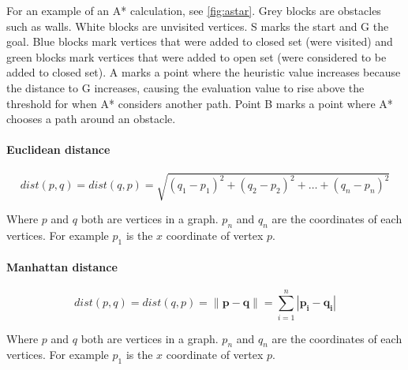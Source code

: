   For an example of an A* calculation, see \cref{fig:astar}. 
  Grey blocks are obstacles such as walls. White blocks are unvisited vertices. S marks the start and G the goal. Blue blocks mark vertices that were added to closed set (were visited) and green blocks mark vertices that were added to open set (were considered to be added to closed set). A marks a point where the heuristic value increases because the distance to G increases, causing the evaluation value to rise above the threshold for when A* considers another path. Point B marks a point where A* chooses a path around an obstacle.

  \paragraph{Euclidean distance}\cite{wiki_euclidean}

  \[
    dist(p, q) = dist(q, p) = \sqrt{(q_{1} - p_{1})^2 + (q_{2} - p_{2})^2 + \dots + (q_{n} - p_{n})^2}
  \]

  Where $p$ and $q$ both are vertices in a graph. $p_{n}$ and $q_{n}$ are the coordinates of each vertices. For example $p_{1}$ is the $x$ coordinate of vertex $p$.

    \paragraph{Manhattan distance}\cite{wiki_manhattan_distance}

  \[
    dist(p, q) = dist(q, p) = \| \mathbf{p} - \mathbf{q} \| = \sum\limits_{i=1}^n | \mathbf{p_{i}} - \mathbf{q_{i}} |
  \]

  Where $p$ and $q$ both are vertices in a graph. $p_{n}$ and $q_{n}$ are the coordinates of each vertices. For example $p_{1}$ is the $x$ coordinate of vertex $p$.




